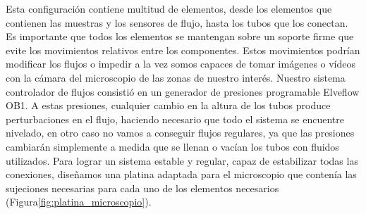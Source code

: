 Esta configuración  contiene multitud de elementos, desde los elementos que contienen las muestras y los sensores de flujo, hasta los tubos que los conectan. Es importante que todos los elementos se mantengan sobre un soporte firme que evite los movimientos relativos entre los componentes. Estos movimientos podrían modificar los flujos o impedir a la vez somos capaces de tomar imágenes o vídeos con la cámara del microscopio de las zonas de nuestro interés. Nuestro sistema controlador de flujos consistió en un generador de presiones programable Elveflow OB1. A estas presiones, cualquier cambio en la altura de los tubos produce perturbaciones en el flujo, haciendo necesario que todo el sistema se encuentre nivelado, en otro caso no vamos a conseguir flujos regulares, ya que las presiones cambiarán simplemente a medida que se llenan o vacían los tubos con fluidos utilizados. Para lograr un sistema estable y regular, capaz de estabilizar todas las conexiones, diseñamos una platina adaptada para el microscopio que contenía las sujeciones necesarias para cada uno de los elementos necesarios  (Figura\ref{fig:platina_microscopio}).

